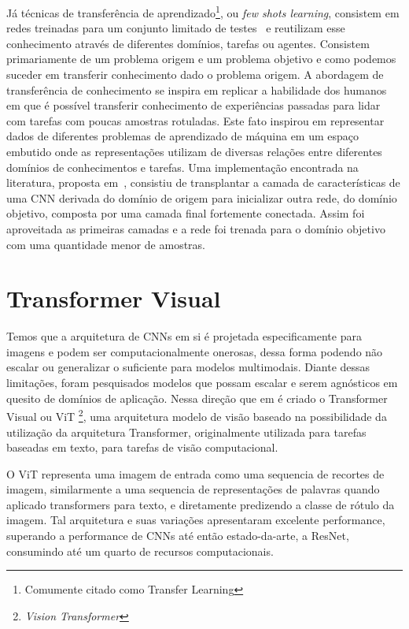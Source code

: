 Já técnicas de transferência de aprendizado\footnote{Comumente citado como Transfer Learning}, ou \textit{few shots learning}, consistem em redes treinadas para um conjunto limitado de testes~\cite{rostami2019learning}
e reutilizam esse conhecimento através de diferentes domínios, tarefas ou agentes. Consistem primariamente de um problema origem e um problema objetivo e como podemos suceder em transferir conhecimento dado o problema origem. A abordagem de transferência de conhecimento se inspira em replicar a habilidade dos humanos em que é possível transferir conhecimento de experiências passadas para lidar com tarefas com poucas amostras rotuladas. Este fato inspirou em representar dados de diferentes problemas de aprendizado de máquina em um espaço embutido onde as representações utilizam de diversas relações entre diferentes domínios de conhecimentos e tarefas. Uma implementação encontrada na literatura, proposta em~\cite{rostami2019learning}, consistiu de transplantar a camada de características de uma CNN derivada do domínio de origem para inicializar outra rede, do domínio objetivo, composta por uma camada final fortemente conectada. Assim foi aproveitada as primeiras camadas e a rede foi trenada para o domínio objetivo com uma quantidade menor de amostras.


\section{Transformer Visual}\label{sec:Cap2_transformer_visual}


Temos que a arquitetura de CNNs em si é projetada especificamente para imagens e podem ser computacionalmente onerosas, dessa forma podendo não escalar ou generalizar o suficiente para modelos multimodais. Diante dessas limitações, foram pesquisados modelos que possam escalar e serem agnósticos em quesito de domínios de aplicação. Nessa direção que em \cite{dosovitskiy2020image} é criado o Transformer Visual ou ViT \footnote{\textit{Vision Transformer}}, uma arquitetura modelo de visão baseado na possibilidade da utilização da arquitetura Transformer, originalmente utilizada para tarefas baseadas em texto, para tarefas de visão computacional.

O ViT representa uma imagem de entrada como uma sequencia de recortes de imagem, similarmente a uma sequencia de representações de palavras quando aplicado transformers para texto, e diretamente predizendo a classe de rótulo da imagem. Tal arquitetura e suas variações apresentaram excelente performance, superando a performance de CNNs até então estado-da-arte, a ResNet, consumindo até um quarto de recursos computacionais.


